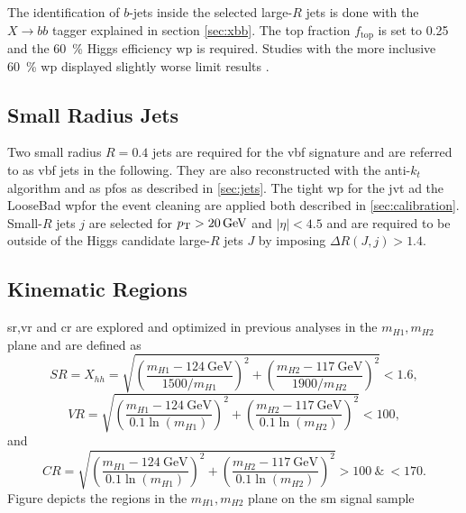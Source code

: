 
The identification of $b$-jets inside the selected large-$R$ jets is done with the $X\rightarrow bb$ tagger explained in section \ref{sec:xbb}. The top fraction $f_\text{top}$ is set to 0.25 and the \qty[]{60}{\percent} Higgs efficiency \ac{wp} is required. Studies with the more inclusive \qty[]{60}{\percent} \ac{wp} displayed slightly worse limit results \citep{ATL-COM-PHYS-2023-033}.

\subsection{Small Radius Jets}
Two small radius $R=0.4$ jets are required for the \ac{vbf} signature and are referred to as \ac{vbf} jets in the following. They are also reconstructed with the anti-$k_t$ algorithm and as \acp{pfo} as described in \ref{sec:jets}. The tight \ac{wp} for the \ac{jvt} ad the LooseBad \ac{wp}for the event cleaning are applied both described in \ref{sec:calibration}. Small-$R$ jets $j$ are selected for $p_{\text{T}}>\qty[]{20}{GeV}$ and $|\eta|<4.5$ and are required to be outside of the Higgs candidate large-$R$ jets $J$ by imposing $\Delta R(J,j) > 1.4$. 

\subsection{Kinematic Regions}\label{sec:kinematic_regions}
\ac{sr},\ac{vr} and \ac{cr} are explored and optimized in previous analyses \citep{aad2023search,ATL-COM-PHYS-2023-033} in the $m_{H1},m_{H2}$ plane and are defined as
\begin{equation}
    SR=X_{hh} =  \sqrt{\left(\frac{m_{H1} - \SI{124}{\GeV}}{1500 / m_{H1}}\right)^{2} + \left(\frac{m_{H2} - \SI{117}{\GeV}}{1900 / m_{H2}}\right)^{2}} < 1.6,
\end{equation}
\begin{equation}
    \label{VR_Xhh}
    VR =  \sqrt{\left(\frac{m_{H1} - \SI{124}{\GeV}}{0.1 \ln(m_{H1})}\right)^{2} + \left(\frac{m_{H2} - \SI{117}{\GeV}}{0.1 \ln(m_{H2})}\right)^{2}} < 100,
\end{equation}
and
\begin{equation}
    \label{CR_Xhh}
    CR = \sqrt{\left(\frac{m_{H1} - \SI{124}{\GeV}}{0.1 \ln(m_{H1})}\right)^{2} + \left(\frac{m_{H2} - \SI{117}{\GeV}}{0.1 \ln(m_{H2})}\right)^{2}} > 100  \ \& \ < 170.
\end{equation}
Figure depicts the regions in the $m_{H1},m_{H2}$ plane on the \ac{sm} signal sample

